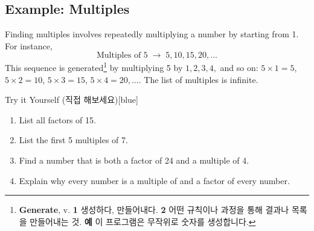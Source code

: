 \documentclass[12pt]{book}
\begin{document}
  \subsection*{Example: Multiples}
  Finding multiples involves repeatedly multiplying a number 
  by  starting from 1. For instance,
  \[
    \text{Multiples of } 5 \;\rightarrow\; 5, 10, 15, 20, \ldots
  \]
  This sequence is generated\footnote{
    \textbf{Generate}, v. \textbf{1} 생성하다, 만들어내다. \textbf{2} 어떤 규칙이나 과정을 통해 결과나 목록을 만들어내는 것.
    \textbf{예} 이 프로그램은 무작위로 숫자를 생성합니다.
  } by multiplying 5 by $1, 2, 3, 4,$ and so on: $5 \times 1 = 5$, $5 \times 2 = 10$, $5 \times 3 = 15$, $5 \times 4 = 20, \ldots$. The list of multiples is infinite.
  \begin{flexbox}{Try it Yourself (직접 해보세요)}[blue]
    \begin{enumerate}
      \item List all factors of 15.\vspace*{20pt}
      \item List the first 5 multiples of 7.\vspace*{20pt}
      \item Find a number that is both a factor of 24 and a multiple of 4.\vspace*{20pt}
      \item Explain why every number is a multiple of  and  
      a factor of every number.\vspace*{20pt}
    \end{enumerate}
  \end{flexbox}
\end{document}

